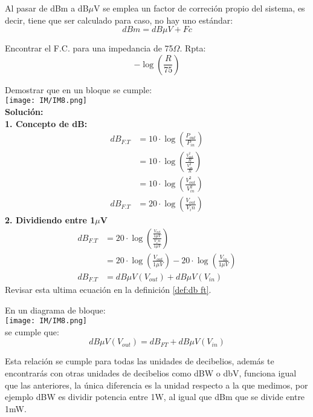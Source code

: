 \documentclass[
	11pt, %
	fleqn, %
	a4paper, %
]{LegrandOrangeBook}
\begin{document}
\begin{definition}
Al pasar de dBm a dB$\mu$V se emplea un factor de correción propio del sistema, es decir, tiene que ser calculado para caso, no hay uno estándar:
\begin{equation}
dBm=dB\mu V + Fc
\end{equation}
\end{definition}
\begin{exercise}
Encontrar el F.C. para una impedancia de 75$\Omega$. Rpta:
\begin{displaymath}
-\log\left(\frac{R}{75}\right)
\end{displaymath}
\end{exercise}
\begin{example}[Demostraciones]
Demostrar que en un bloque se cumple:\\
\texttt{[image: IM/IM8.png]}\\
\textbf{Solución:}\\
\textbf{1. Concepto de dB:}
\begin{align}
dB_{F.T}&=10\cdot\log\left(\frac{P_{out}}{P_{in}}\right)\\
&=10\cdot\log\left(\frac{\frac{V_{out}^2}{R}}{\frac{V_{in}^2}{R}}\right)\\
&=10\cdot\log\left(\frac{V_{out}^2}{V_{in}^2}\right)\\
dB_{F.T}&=20\cdot\log\left(\frac{V_{out}}{V_in}\right)
\end{align}
\textbf{2. Dividiendo entre 1$\mu$V}
\begin{align}
dB_{F.T}&=20\cdot\log\left(\frac{\frac{V_{out}}{1\mu V}}{\frac{V_in}{1\mu V}}\right)\\
&=20\cdot\log\left(\frac{V_{out}}{1\mu V}\right)-20\cdot\log\left(\frac{V_{in}}{1\mu V}\right)\\
dB_{F.T}&=dB\mu V(V_{out})+dB\mu V(V_{in})
\end{align}
Revisar esta ultima ecuación en la definición \ref{def:db ft}.
\end{example}
\begin{definition}\label{def:db ft}
En un diagrama de bloque:\\
\texttt{[image: IM/IM8.png]}\\
se cumple que:
\begin{equation}
\label{eq:db de ft}
dB\mu V(V_{out})=dB_{FT}+dB\mu V(V_{in})
\end{equation}
\end{definition}
\begin{remark}
Esta relación se cumple para todas las unidades de decibelios, además te encontrarás con otras unidades de decibelios como dBW o dbV, funciona igual que las anteriores, la única diferencia es la unidad respecto a la que medimos, por ejemplo dBW es dividir potencia entre 1W, al igual que dBm que se divide entre 1mW.
\end{remark}
\end{document}
